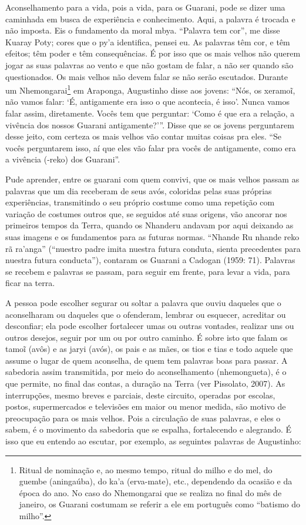Aconselhamento para a vida, pois a vida, para os Guarani, pode se dizer
uma caminhada em busca de experiência e conhecimento. Aqui, a palavra é
trocada e não imposta. Eis o fundamento da moral mbya. ``Palavra tem
cor'', me disse Kuaray Poty; cores que o py’a identifica, pensei eu. As
palavras têm cor, e têm efeitos; têm poder e têm consequências. É por
isso que os mais velhos não querem jogar as suas palavras ao vento e
que não gostam de falar, a não ser quando são questionados. Os mais velhos
não devem falar se não serão escutados. Durante um
Nhemongarai\footnote{Ritual de nominação e, ao mesmo tempo, ritual do
milho e do mel, do guembe (aningaúba), do ka’a (erva-mate), etc.,
dependendo da ocasião e da época do ano. No caso do Nhemongarai que se
realiza no final do mês de janeiro, os Guarani costumam se referir a
ele em português como ``batismo do milho''.} em Araponga, Augustinho
disse aos jovens: ``Nós, os xeramo\~{i}, não vamos falar: ‘É,
antigamente era isso o que acontecia, é isso’. Nunca vamos falar assim,
diretamente. Vocês tem que perguntar: ‘Como é que era a relação, a
vivência dos nossos Guarani antigamente?’''. Disse que se os jovens
perguntarem desse jeito, com certeza os mais velhos vão contar muitas
coisas pra eles. ``Se vocês perguntarem isso, aí que eles vão falar pra
vocês de antigamente, como era a vivência (-reko) dos Guarani''. 

Pude aprender, entre os guarani com quem convivi, que os mais velhos
passam as palavras que um dia receberam de seus avós, coloridas pelas
suas próprias experiências, transmitindo o seu próprio costume como uma
repetição com variação de costumes outros que, se seguidos até suas
origens, vão ancorar nos primeiros tempos da Terra, quando os Nhanderu
andavam por aqui deixando as suas imagens e os fundamentos para as
futuras normas. ``Nhande Ru nhande reko rã ra’anga'' (``nuestro padre
imita nuestra futura conduta, sienta precedentes para nuestra futura
conducta''), contaram os Guarani a Cadogan (1959: 71). Palavras se
recebem e palavras se passam, para seguir em frente, para levar a vida,
para ficar na terra.

A pessoa pode escolher segurar ou soltar a palavra que ouviu daqueles
que o aconselharam ou daqueles que o ofenderam, lembrar ou esquecer,
acreditar ou desconfiar; ela pode escolher fortalecer umas ou outras
vontades, realizar uns ou outros desejos, seguir por um ou por outro
caminho. É sobre isto que falam os tamo\~{i} (avôs) e as jaryi (avós),
os pais e as mães, os tios e tias e todo aquele que assume o lugar de
quem aconselha, de quem tem palavras boas para passar. A sabedoria
assim transmitida, por meio do aconselhamento (nhemongueta), é o que
permite, no final das contas, a duração na Terra (ver Pissolato, 2007).
As interrupções, mesmo breves e parciais, deste circuito, operadas por
escolas, postos, supermercados e televisões em maior ou menor medida,
são motivo de preocupação para os mais velhos. Pois a circulação de
suas palavras, e eles o sabem, é o movimento da sabedoria que se
espalha, fortalecendo e alegrando. É isso que eu entendo ao escutar,
por exemplo, as seguintes palavras de Augustinho:

